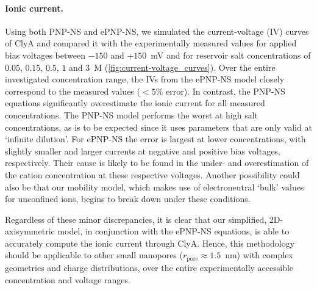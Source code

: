 \documentclass[journal=ancac3,manuscript=article,etalmode=truncate,maxauthors=0,layout=twocolumn]{achemso}
\begin{document}

\paragraph{Ionic current.}
Using both PNP-NS and ePNP-NS, we simulated the current-voltage (IV) curves of ClyA and compared it with the
experimentally measured values for applied bias voltages between $-150$ and $+150$~mV and for reservoir salt
concentrations of $0.05$, $0.15$, $0.5$, $1$ and $3$~M (\cref{fig:current-voltage_curves}). Over the entire
investigated concentration range, the IVs from the ePNP-NS model closely correspond to the measured values
($<5\%$ error). In contrast, the PNP-NS equations significantly overestimate the ionic current for all
measured concentrations. The PNP-NS model performs the worst at high salt concentrations, as is to be
expected since it uses parameters that are only valid at `infinite dilution'. For ePNP-NS the error is
largest at lower concentrations, with slightly smaller and larger currents at negative and positive bias
voltages, respectively. Their cause is likely to be found in the under- and overestimation of the cation
concentration at these respective voltages. Another possibility could also be that our mobility
model, which makes use of electroneutral `bulk' values for unconfined ions, begins to break down under these
conditions.\cite{Duan-2010}

Regardless of these minor discrepancies, it is clear that our simplified, 2D-axisymmetric model, in
conjunction with the ePNP-NS equations, is able to accurately compute the ionic current through ClyA. Hence,
this methodology should be applicable to other small nanopores ($r_{\text{pore}}\approx1.5$~nm) with complex
geometries and charge distributions, over the entire experimentally accessible concentration and voltage
ranges.

\end{document}
